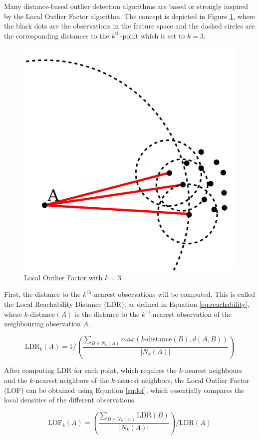 Many distance-based outlier detection algorithms are based or strongly inspired by the Local Outlier Factor algorithm. The concept is depicted in Figure \ref{fig:lof}, where the black dots are the observations in the feature space and the dashed circles are the corresponding distances to the $k^{\text{th}}$-point which is set to $k=3$.

\begin{figure}[ht!]
\centering
\includegraphics[width=.6\textwidth]{figures/lof.png}
\caption{Local Outlier Factor with $k=3$. \label{fig:lof}}
\end{figure}

First, the distance to the $k^{\text{th}}$-nearest observations will be computed. This is called the Local Reachability Distance (LDR), as defined in Equation \ref{eq:reachability}, where $k\text{-distance}(A)$ is the distance to the $k^{\text{th}}$-nearest observation of the neighbouring observation $A$. 

\begin{equation}
\text{LDR}_{k}(A) = 1 / \left( \frac{\sum_{B \in N_{k}(A)} max(k\text{-distance}(B), d(A,B))}{|N_{k}(A)|} \right) \label{eq:reachability}
\end{equation}

After computing LDR for each point, which requires the $k$-nearest neighbours and the $k$-nearest neighbors of the $k$-nearest neighbors, the Local Outlier Factor (LOF) can be obtained using Equation \ref{eq:lof}, which essentially compares the local densities of the different observations.

\begin{equation}
\text{LOF}_{k}(A) = \left( \frac{\sum_{B \in N_{k}(A)} \text{LDR}(B)}{|N_{k}(A)|} \right) / \text{LDR}(A)
\label{eq:lof}
\end{equation}

